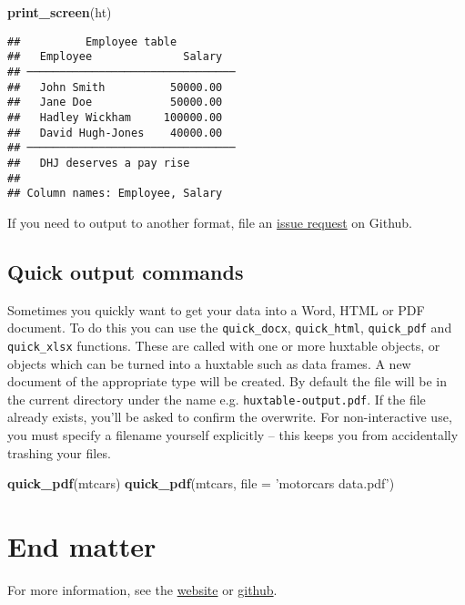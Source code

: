 \documentclass[]{article}
\newenvironment{Shaded}{\begin{snugshade}}{\end{snugshade}}
\newcommand{\KeywordTok}[1]{\textcolor[rgb]{0.13,0.29,0.53}{\textbf{#1}}}
\newcommand{\DataTypeTok}[1]{\textcolor[rgb]{0.13,0.29,0.53}{#1}}
\newcommand{\StringTok}[1]{\textcolor[rgb]{0.31,0.60,0.02}{#1}}
\newcommand{\NormalTok}[1]{#1}
\begin{document}
\begin{Shaded}
\begin{Highlighting}[]
\KeywordTok{print_screen}\NormalTok{(ht)}
\end{Highlighting}
\end{Shaded}

\begin{verbatim}
##          Employee table         
##   Employee              Salary  
## ────────────────────────────────
##   John Smith          50000.00  
##   Jane Doe            50000.00  
##   Hadley Wickham     100000.00  
##   David Hugh-Jones    40000.00  
## ────────────────────────────────
##   DHJ deserves a pay rise       
## 
## Column names: Employee, Salary
\end{verbatim}

\FloatBarrier

If you need to output to another format, file an
\href{https://github.com/hughjonesd/huxtable}{issue request} on Github.

\subsection{Quick output commands}\label{quick-output-commands}

Sometimes you quickly want to get your data into a Word, HTML or PDF
document. To do this you can use the \texttt{quick\_docx},
\texttt{quick\_html}, \texttt{quick\_pdf} and \texttt{quick\_xlsx}
functions. These are called with one or more huxtable objects, or
objects which can be turned into a huxtable such as data frames. A new
document of the appropriate type will be created. By default the file
will be in the current directory under the name e.g.
\texttt{huxtable-output.pdf}. If the file already exists, you'll be
asked to confirm the overwrite. For non-interactive use, you must
specify a filename yourself explicitly -- this keeps you from
accidentally trashing your files.

\begin{Shaded}
\begin{Highlighting}[]
\KeywordTok{quick_pdf}\NormalTok{(mtcars) }
\KeywordTok{quick_pdf}\NormalTok{(mtcars, }\DataTypeTok{file =} \StringTok{'motorcars data.pdf'}\NormalTok{)}
\end{Highlighting}
\end{Shaded}

\FloatBarrier

\section{End matter}\label{end-matter}

For more information, see the
\href{https://hughjonesd.github.io/huxtable}{website} or
\href{https://github.com/hughjonesd/huxtable}{github}.
\end{document}
